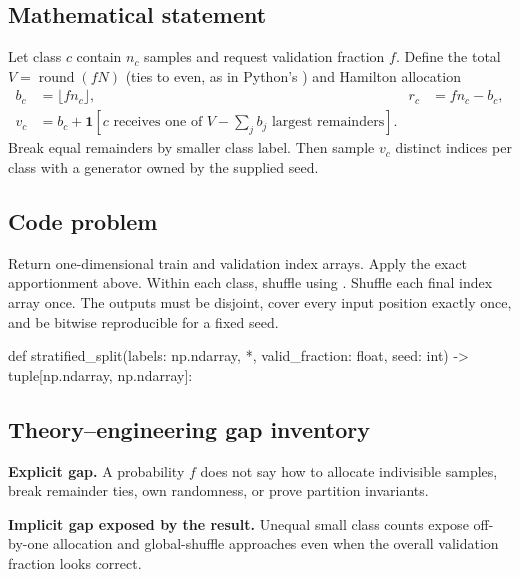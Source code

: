 
        \subsection{Mathematical statement}


Let class $c$ contain $n_c$ samples and request validation fraction $f$.  Define
the total $V=\operatorname{round}(fN)$ (ties to even, as in Python's
) and Hamilton allocation
\[
\begin{aligned}
b_c&=\lfloor fn_c\rfloor, & r_c&=fn_c-b_c,\\
v_c&=b_c+\mathbf 1[c\text{ receives one of }V-\sum_jb_j
\text{ largest remainders}].
\end{aligned}
\]
Break equal remainders by smaller class label.  Then sample $v_c$ distinct
indices per class with a generator owned by the supplied seed.


        \subsection{Code problem}


Return one-dimensional  train and validation index arrays.  Apply
the exact apportionment above.\newline
Within each class, shuffle using .\newline
Shuffle each final index array once.
The outputs must be disjoint, cover every input position exactly once, and be
bitwise reproducible for a fixed seed.


        \begin{contractbox}
        \begin{Code}
        def stratified_split(labels: np.ndarray, *, valid_fraction: float, seed: int) -> tuple[np.ndarray, np.ndarray]:
        \end{Code}
        \end{contractbox}

        \subsection{Theory--engineering gap inventory}

        \begin{gapbox}
        \textbf{Explicit gap.} A probability $f$ does not say how to allocate indivisible samples, break remainder ties, own randomness, or prove partition invariants.

        \textbf{Implicit gap exposed by the result.} Unequal small class counts expose off-by-one allocation and global-shuffle approaches even when the overall validation fraction looks correct.
        \end{gapbox}

